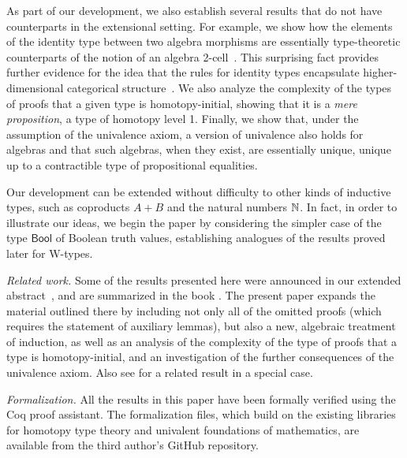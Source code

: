 \documentclass[10pt,a4paper,oneside,reqno]{amsart}
\numberwithin{equation}{section}
\theoremstyle{mythm}
\theoremstyle{mydef}
\theoremstyle{myrmk}
\newcommand{\ie}{\text{i.e.\ }}
\newcommand{\Bool}{\mathsf{Bool}}
\begin{document}
As part of our development, we also establish several results that do not have counterparts in the extensional setting.  
For  example, we show how the elements of the identity type between two algebra morphisms are essentially
 type-theoretic counterparts of the notion of an algebra 2-cell~\cite{BlackwellR:twodmt}.
This surprising fact provides further evidence for the idea that the rules for identity types encapsulate 
higher-dimensional categorical structure~\cite{LumsdaineP:weaci,vandenBergB:typwg}. We also
analyze the complexity of the types of proofs that a given type is homotopy-initial, showing that it
is a \emph{mere proposition}, \ie a type of homotopy level 1. Finally, we show that, 
under the assumption of the univalence axiom, a version of univalence  also holds for
algebras and that such algebras, when they exist, are
essentially unique, \ie unique up to a contractible type of propositional equalities. 

Our development can be extended without difficulty to other kinds of inductive types, such as coproducts $A + B$ and the natural numbers  $\mathbb{N}$.  In fact, in order to illustrate our ideas,  we begin the paper by considering the simpler case
of the type $\Bool$ of Boolean truth values, establishing analogues of the results proved
later for W-types. 

\medskip

\noindent
\emph{Related work.} Some of the results presented here were announced in our extended abstract~\cite{wtypes}, and are summarized in the book \cite{hott}. The present paper expands the material outlined there by including not only all of the omitted proofs (which requires the statement of auxiliary lemmas), but also a new, algebraic treatment of induction, as well as an analysis of the complexity of the type of proofs that a type is homotopy-initial, and an investigation of the further consequences of the univalence axiom.  Also see \cite{vandenBergMoerdijk:Wtypes} for a related result in a special case.

\smallskip

\noindent
\emph{Formalization.} All the results in this paper have been formally verified using the
Coq proof assistant. The formalization files, which build on the existing libraries for homotopy type theory and 
univalent foundations of mathematics, are available from the third author's GitHub repository.

\smallskip
\end{document}
